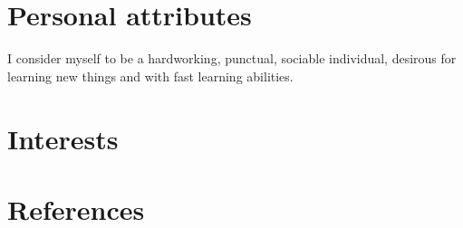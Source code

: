 \documentclass[12pt,a4paper]{moderncv}
\begin{document}
\section{Personal attributes}
I consider myself to be a hardworking, punctual, sociable individual, desirous for learning new things and with fast learning abilities.

\section{Interests}

\renewcommand{\listitemsymbol}{} %

\section{References}
\end{document}
